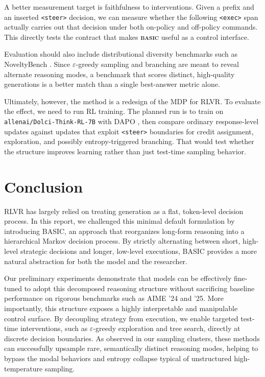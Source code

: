 \documentclass[10pt,twocolumn]{article}
\newcommand{\methodname}{\textbf{\textsf{\textsc{basic}}}}
\newcommand{\methodname}{{\sffamily\bfseries{\fontsize{0.95em}{0.95em}\selectfont BASIC}}}
\begin{document}
A better measurement target is faithfulness to interventions. Given a prefix and
an inserted \texttt{<steer>} decision, we can measure whether the following
\texttt{<exec>} span actually carries out that decision under both
on-policy and
off-policy commands. This directly tests the contract that makes
\methodname{} useful as a control interface.

Evaluation should also include distributional diversity benchmarks such as
NoveltyBench \citep{zhang2025noveltybench}. Since \(\varepsilon\)-greedy
sampling and branching are meant to reveal alternate reasoning modes, a benchmark
that scores distinct, high-quality generations is a better match than a single
best-answer metric alone.

Ultimately, however, the method is a redesign of the MDP for RLVR. To evaluate the
effect, we need to run RL training. The planned run is to train on
\texttt{allenai/Dolci-Think-RL-7B} with DAPO
\citep{allenai2026dolcithinkrl7b,yu2025dapo}, then compare ordinary
response-level updates against updates that exploit \texttt{<steer>}
boundaries
for credit assignment, exploration, and possibly entropy-triggered branching.
That would test whether the structure improves learning rather than just test-time
sampling behavior.

\section{Conclusion}
\label{sec:conclusion}

RLVR has largely relied on
treating generation as a flat, token-level decision process. In this report, we
challenged this minimal default formulation by introducing BASIC, an approach that
reorganizes long-form reasoning into a hierarchical Markov decision process. By
strictly alternating between short, high-level strategic decisions and longer,
low-level executions, BASIC provides a more natural abstraction for both the model and
the researcher.

Our preliminary experiments demonstrate that models can be effectively fine-tuned to
adopt this decomposed reasoning structure without sacrificing baseline performance on
rigorous benchmarks such as AIME '24 and '25. More importantly, this structure exposes
a
highly interpretable and manipulable control surface. By decoupling strategy from
execution, we enable targeted test-time interventions, such as
\(\varepsilon\)-greedy exploration and tree search, directly at discrete
decision boundaries. As observed in our sampling clusters, these methods can
successfully upsample rare, semantically distinct reasoning modes, helping to bypass
the modal behaviors and entropy collapse typical of unstructured high-temperature
sampling.
\end{document}
